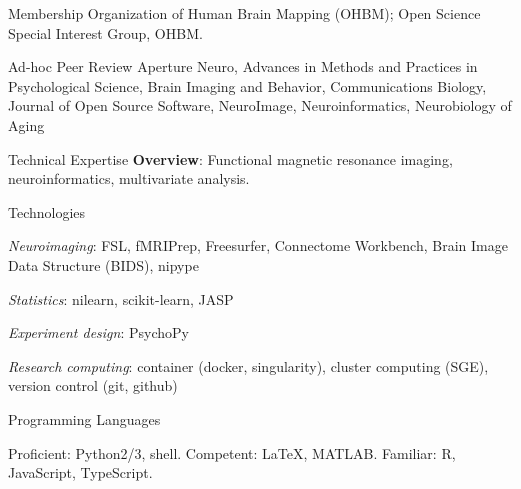 \documentclass{resume} %
\begin{document}
\begin{rSection}{Membership}
Organization of Human Brain Mapping (OHBM); Open Science Special Interest Group, OHBM.
\end{rSection}

\pagebreak

\begin{rSection}{Ad-hoc Peer Review}
Aperture Neuro,
Advances in Methods and Practices in Psychological Science,
Brain Imaging and Behavior,
Communications Biology,
Journal of Open Source Software,
NeuroImage,
Neuroinformatics,
Neurobiology of Aging
\end{rSection}


\begin{rSection}{Technical Expertise}
  \textbf{Overview}: Functional magnetic resonance imaging,
  neuroinformatics, multivariate analysis.

\begin{rSubsection}{Technologies}{}{}{}
  \item \textit{Neuroimaging}: FSL, fMRIPrep, Freesurfer, Connectome Workbench,
                      Brain Image Data Structure (BIDS), nipype
  \item \textit{Statistics}:  nilearn, scikit-learn, JASP
  \item \textit{Experiment design}: PsychoPy
  \item \textit{Research computing}: container (docker, singularity),
                            cluster computing (SGE),
                            version control (git, github)
\end{rSubsection}
\begin{rSubsection}{Programming Languages}{}{}{}
  \item Proficient: Python2/3, shell. Competent: \LaTeX, MATLAB. Familiar: R, JavaScript, TypeScript.
\end{rSubsection}

\end{rSection}


\end{document}
